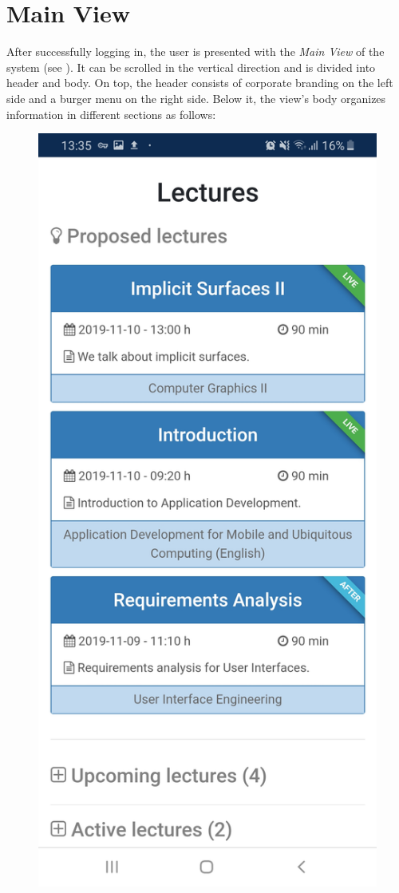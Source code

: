 \section{Main View}
\label{section:soa:mainview}
After successfully logging in, the user is presented with the \emph{Main View} of the system (see ).
It can be scrolled in the vertical direction and is divided into header and body. On top, the header consists of corporate branding on the left side and a burger menu on the right side. Below it, the view's body organizes information in different sections as follows:

\begin{figure}
	\centering
	\begin{minipage}[t]{.5\textwidth}
		\centering
		\includegraphics[width=0.95\linewidth]{screenshots/main_view_1.jpg}

\end{minipage}
\end{figure}
